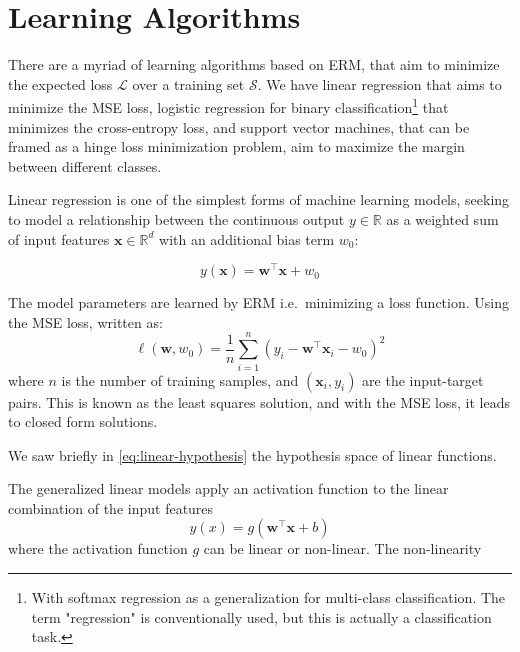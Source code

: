 \section{Learning Algorithms}
There are a myriad of learning algorithms based on \gls{ERM}, that aim to minimize the expected loss $\mathcal{L}$ over a training set $\mathcal{S}$.  We have linear regression that aims to minimize the \gls{MSE} loss, logistic regression for binary classification\footnote{With softmax regression as a generalization for multi-class classification. The term "regression" is conventionally used, but this is actually a classification task.} that minimizes the cross-entropy loss, and support vector machines, that can be framed as a hinge loss minimization problem, aim to maximize the margin between different classes.


Linear regression is one of the simplest forms of machine learning models, seeking to model a relationship between the continuous output $y \in \mathbb{R}$ as a weighted sum of input features $\mathbf{x} \in \mathbb{R}^d$ with an additional bias term $w_0$:

\begin{equation}\label{eq:linear-regression}
    y(\mathbf{x}) = \mathbf{w}^\top \mathbf{x} + w_0
\end{equation}

The model parameters are learned by \gls{ERM} i.e.\ minimizing a loss function. Using the \gls{MSE} loss, written as:
\begin{equation}\label{eq:mse-loss}
    \ell(\mathbf{w}, w_0) = \frac{1}{n} \sum_{i=1}^{n} (y_i - \mathbf{w}^\top \mathbf{x}_i - w_0)^2
\end{equation}
where $n$ is the number of training samples, and $(\mathbf{x}_i, y_i)$ are the input-target pairs. This is known as the least squares solution, and with the MSE loss, it leads to closed form solutions.

We saw briefly in \cref{eq:linear-hypothesis} the hypothesis space of linear functions. 

The generalized linear models apply an activation function to the linear combination of the input features
\begin{equation}
    y(x) = g(\mathbf{w}^\top \mathbf{x} + b)
\end{equation}
where the activation function $g$ can be linear or non-linear. The non-linearity 


